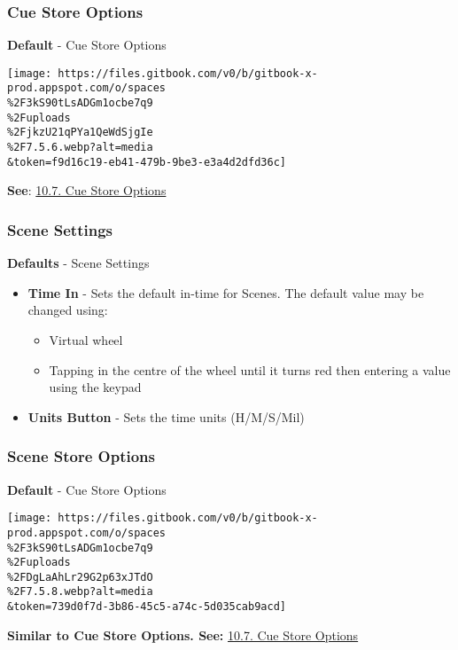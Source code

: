 \documentclass[
]{article}
\begin{document}
\hypertarget{cue-store-options}{%
\subsubsection{Cue Store Options}\label{cue-store-options}}

\textbf{Default} - Cue Store Options

\texttt{[image: https://files.gitbook.com/v0/b/gitbook-x-prod.appspot.com/o/spaces\\\%2F3kS90tLsADGm1ocbe7q9\\\%2Fuploads\\\%2FjkzU21qPYa1QeWdSjgIe\\\%2F7.5.6.webp?alt=media\\\&token=f9d16c19-eb41-479b-9be3-e3a4d2dfd36c]}

\textbf{See}: \href{https://vibemanual.compulite.com/programming-cues-and-scenes.html\#cue-store-options-1}{10.7. Cue Store Options}

\hypertarget{scene-settings}{%
\subsubsection{Scene Settings}\label{scene-settings}}

\textbf{Defaults} - Scene Settings

\begin{itemize}
\item
  \textbf{Time In} - Sets the default in-time for Scenes. The default value may be changed using:

  \begin{itemize}
  \item
    Virtual wheel
  \item
    Tapping in the centre of the wheel until it turns red then entering a value using the keypad
  \end{itemize}
\item
  \textbf{Units Button} - Sets the time units (H/M/S/Mil)
\end{itemize}

\hypertarget{scene-store-options}{%
\subsubsection{Scene Store Options}\label{scene-store-options}}

\textbf{Default} - Cue Store Options

\texttt{[image: https://files.gitbook.com/v0/b/gitbook-x-prod.appspot.com/o/spaces\\\%2F3kS90tLsADGm1ocbe7q9\\\%2Fuploads\\\%2FDgLaAhLr29G2p63xJTdO\\\%2F7.5.8.webp?alt=media\\\&token=739d0f7d-3b86-45c5-a74c-5d035cab9acd]}

\textbf{Similar to Cue Store Options. See:} \href{https://vibemanual.compulite.com/programming-cues-and-scenes.html\#cue-store-options-1}{10.7. Cue Store Options}
\end{document}
